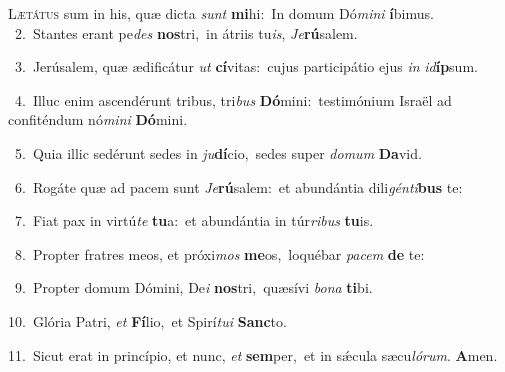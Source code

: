 \lettrine{\initial\textcolor{\initialcolor}{L}}{ætátus} sum in his, quæ dicta \textit{sunt} \textbf{mi}\-hi:~\star In domum Dó\-\textit{mi}\-\textit{ni} \textbf{í}\-bimus.\\
{\numbfont\textcolor{\numbcolor}{~2.}}~Stantes erant pe\textit{des} \textbf{nos}\-tri,~\star in átriis tu\-\textit{is}\-, \textit{Je}\-\textbf{rú}salem.\par
{\numbfont\textcolor{\numbcolor}{~3.}}~Jerúsalem, quæ ædificátur \textit{ut} \textbf{cí}\-vitas:~\star cujus participátio ejus \textit{in} \textit{id}\-\textbf{íp}sum.\par
{\numbfont\textcolor{\numbcolor}{~4.}}~Illuc enim ascendérunt tribus, tri\textit{bus} \textbf{Dó}\-mini:~\star testimónium Israël ad confiténdum nó\-\textit{mi}\-\textit{ni} \textbf{Dó}\-mini.\par
{\numbfont\textcolor{\numbcolor}{~5.}}~Quia illic sedérunt sedes in \textit{ju}\-\textbf{dí}cio,~\star sedes super \textit{do}\-\textit{mum} \textbf{Da}\-vid.\par
{\numbfont\textcolor{\numbcolor}{~6.}}~Rogáte quæ ad pacem sunt \textit{Je}\-\textbf{rú}salem:~\star et abundántia dili\-\textit{gén}\-\textit{ti}\textbf{bus} te:\par
{\numbfont\textcolor{\numbcolor}{~7.}}~Fiat pax in virtú\textit{te} \textbf{tu}\-a:~\star et abundántia in túr\-\textit{ri}\-\textit{bus} \textbf{tu}\-is.\par
{\numbfont\textcolor{\numbcolor}{~8.}}~Propter fratres meos, et próxi\textit{mos} \textbf{me}\-os,~\star loquébar \textit{pa}\-\textit{cem} \textbf{de} te:\par
{\numbfont\textcolor{\numbcolor}{~9.}}~Propter domum Dómini, De\textit{i} \textbf{nos}\-tri,~\star quæsívi \textit{bo}\-\textit{na} \textbf{ti}\-bi.\par
{\numbfont\textcolor{\numbcolor}{10.}}~Glória Patri, \textit{et} \textbf{Fí}\-lio,~\star et Spirí\-\textit{tu}\-\textit{i} \textbf{Sanc}\-to.\par
{\numbfont\textcolor{\numbcolor}{11.}}~Sicut erat in princípio, et nunc, \textit{et} \textbf{sem}\-per,~\star et in sǽcula sæcu\-\textit{ló}\-\textit{rum}. \textbf{A}\-men.\par
